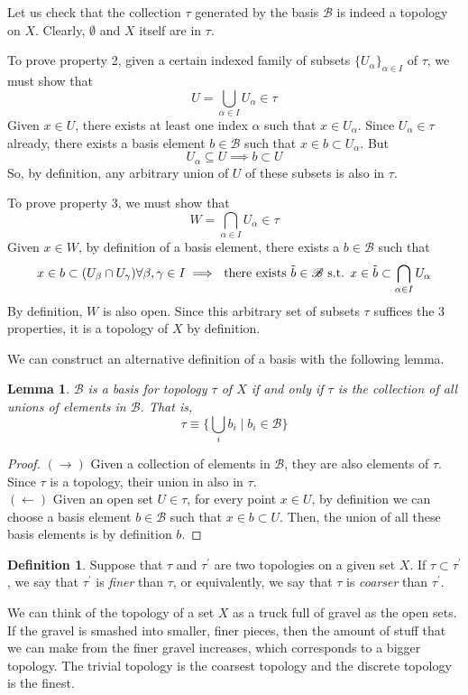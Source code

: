 \documentclass{article}
\newtheorem{lemma}[theorem]{Lemma}
\theoremstyle{remark}
\theoremstyle{definition}
\newtheorem{definition}{Definition}[section]
\begin{document}
Let us check that the collection $\tau$ generated by the basis $\mathscr{B}$ is indeed a topology on $X$. Clearly, $\emptyset$ and $X$ itself are in $\tau$. 

To prove property 2, given a certain indexed family of subsets $\{U_\alpha\}_{\alpha \in I}$ of $\tau$, we must show that 
\[U = \bigcup_{\alpha \in I} U_\alpha \in \tau\]
Given $x \in U$, there exists at least one index $\alpha$ such that $x \in U_\alpha$. Since $U_\alpha \in \tau$ already, there exists a basis element $b \in \mathscr{B}$ such that $x \in b \subset U_\alpha$. But 
\[U_\alpha \subseteq U \implies b \subset U\]
So, by definition, any arbitrary union of $U$ of these subsets is also in $\tau$. 

To prove property 3, we must show that 
\[W = \bigcap_{\alpha \in I} U_\alpha \in \tau\]
Given $x \in W$, by definition of a basis element, there exists a $b \in \mathscr{B}$ such that 
\[x \in b \subset (U_\beta \cap U_\gamma) \forall \beta, \gamma \in I \implies \text{ there exists } \Tilde{b} \in \mathscr{B} \text{ s.t. } x \in \Tilde{b} \subset \bigcap_{\alpha \in I} U_\alpha\]
By definition, $W$ is also open. Since this arbitrary set of subsets $\tau$ suffices the 3 properties, it is a topology of $X$ by definition. 

We can construct an alternative definition of a basis with the following lemma. 

\begin{lemma}
$\mathscr{B}$ is a basis for topology $\tau$ of $X$ if and only if $\tau$ is the collection of all unions of elements in $\mathscr{B}$. That is, 
\[\tau \equiv \Big\{ \bigcup_i b_i \; \Big| \; b_i \in \mathscr{B}\Big\}\]
\end{lemma}
\begin{proof}
$(\rightarrow)$ Given a collection of elements in $\mathscr{B}$, they are also elements of $\tau$. Since $\tau$ is a topology, their union in also in $\tau$. \\
$(\leftarrow)$ Given an open set $U \in \tau$, for every point $x \in U$, by definition we can choose a basis element $b \in \mathscr{B}$ such that $x \in b \subset U$. Then, the union of all these basis elements is by definition $b$. 
\end{proof}

\begin{definition}
Suppose that $\tau$ and $\tau^\prime$ are two topologies on a given set $X$. If $\tau \subset \tau^\prime$, we say that $\tau^\prime$ is \textit{finer} than $\tau$, or equivalently, we say that $\tau$ is \textit{coarser} than $\tau^\prime$. 
\end{definition}
We can think of the topology of a set $X$ as a truck full of gravel as the open sets. If the gravel is smashed into smaller, finer pieces, then the amount of stuff that we can make from the finer gravel increases, which corresponds to a bigger topology. The trivial topology is the coarsest topology and the discrete topology is the finest. 
\end{document}

